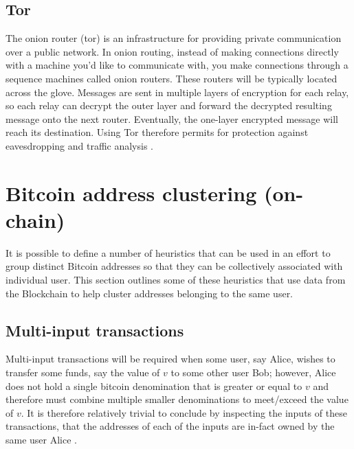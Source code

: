 \subsection{Tor}
The onion router (tor) is an infrastructure for providing private communication over a public network. In onion routing, instead of making connections directly with a machine you'd like to communicate with, you make connections through a sequence machines called onion routers. These routers will be typically located across the glove. Messages are sent in multiple layers of encryption for each relay, so each relay can decrypt the outer layer and forward the decrypted resulting message onto the next router. Eventually, the one-layer encrypted message will reach its destination. Using Tor therefore permits for protection against eavesdropping and traffic analysis \cite{RefWorks:doc:5c3e103be4b014f3944e4192}.

\section{Bitcoin address clustering (on-chain)}

It is possible to define a number of heuristics that can be used in an effort to group distinct Bitcoin addresses so that they can be collectively associated with individual user. This section outlines some of these heuristics that use data from the Blockchain to help cluster addresses belonging to the same user.

\subsection{Multi-input transactions}\label{background:multi-input-tx}
Multi-input transactions will be required when some user, say Alice, wishes to transfer some funds, say the value of $v$ to some other user Bob; however, Alice does not hold a single bitcoin denomination that is greater or equal to $v$ and therefore must combine multiple smaller denominations to meet/exceed the value of $v$. It is therefore relatively trivial to conclude by inspecting the inputs of these transactions, that the addresses of each of the inputs are in-fact owned by the same user Alice \cite{RefWorks:doc:5c3de14be4b042abd3bcc2c6}.

